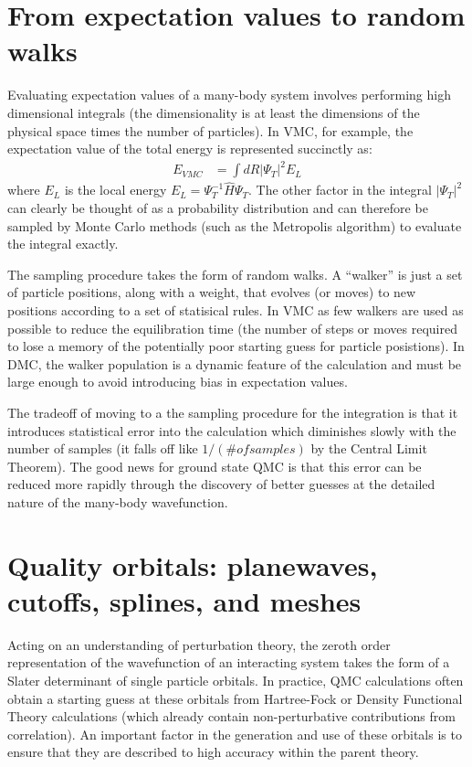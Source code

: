 \documentclass[oneside,11pt]{memoir}
\numberwithin{equation}{section}
\newcommand{\abs}[1]{\lvert #1 \rvert}
\begin{document}
\section{From expectation values to random walks}
Evaluating expectation values of a many-body system involves performing high 
dimensional integrals (the dimensionality is at least the dimensions of the 
physical space times the number of particles).  In VMC, for example, the 
expectation value of the total energy is represented succinctly as:
\begin{align}
  E_{VMC} &= \int dR \abs{\Psi_T}^2 E_L
\end{align}
where $E_L$ is the local energy $E_L=\Psi_T^{-1}\hat{H}\Psi_T$.  The other 
factor in the integral $\abs{\Psi_T}^2$ can clearly be thought of as a 
probability distribution and can therefore be sampled by Monte Carlo 
methods (such as the Metropolis algorithm) to evaluate the integral exactly.

The sampling procedure takes the form of random walks.  A ``walker'' is just 
a set of particle positions, along with a weight, that evolves (or moves) to 
new positions according to a set of statisical rules.  In VMC as few walkers 
are used as possible to reduce the equilibration time (the number of steps or 
moves required to lose a memory of the potentially poor starting guess for 
particle posistions).  In DMC, the walker population is a dynamic feature of 
the calculation and must be large enough to avoid introducing bias in 
expectation values.

The tradeoff of moving to a the sampling procedure for the integration is that 
it introduces statistical error 
into the calculation which diminishes slowly with the number of samples 
(it falls off like $1/(\# of samples)$ by the Central Limit Theorem).  The 
good news for ground state QMC is that this error can be reduced more rapidly 
through the discovery of better guesses at the detailed nature of the 
many-body wavefunction.


\section{Quality orbitals: planewaves, cutoffs, splines, and meshes}
Acting on an understanding of perturbation theory, the zeroth order 
representation of the wavefunction of an interacting system takes the form 
of a Slater determinant of single particle orbitals.  In practice, QMC 
calculations often obtain a starting guess at these orbitals from Hartree-Fock 
or Density Functional Theory calculations (which already contain 
non-perturbative contributions from correlation).  An important factor 
in the generation and use of these orbitals is to ensure that they are 
described to high accuracy within the parent theory.
\end{document}
